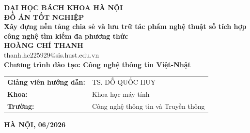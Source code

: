 \begin{titlepage}
\thispagestyle{empty}
\begin{center}
{\textbf{\large ĐẠI HỌC BÁCH KHOA HÀ NỘI}}\\[4cm]
{\textbf{\huge ĐỒ ÁN TỐT NGHIỆP}}\\[1.0cm]
{\textbf{\Large Xây dựng nền tảng chia sẻ và lưu trữ tác phẩm nghệ thuật số tích hợp công nghệ tìm kiếm đa phương thức}}\\[1.2cm]

{\textbf{\large HOÀNG CHÍ THANH}}\\[0.3cm]
{\large thanh.hc225929@sis.hust.edu.vn}\\[0.8cm]
{\textbf{\large{Chương trình đào tạo: Công nghệ thông tin Việt-Nhật}}}\\
\vspace{4cm}
\begin{table}[H]
\centering
\begin{tabular}{ll}
\textbf{Giảng viên hướng dẫn:} & TS. ĐỖ QUỐC HUY \\[0.5cm]
\textbf{Khoa:} & Khoa học máy tính \\[0.5cm]
\textbf{Trường:} & Công nghệ thông tin và Truyền thông \\[0.5cm]
\end{tabular}
\end{table}

\vfill
{\textbf{HÀ NỘI, 06/2026}}
\end{center}
\end{titlepage}
